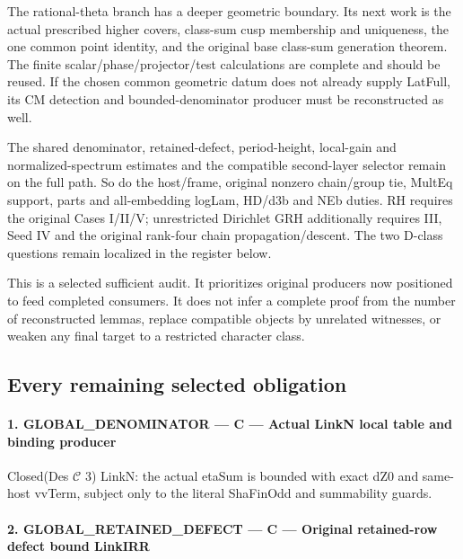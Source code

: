 The rational-theta branch has a deeper geometric boundary. Its next work is the actual prescribed higher covers, class-sum cusp membership and uniqueness, the one common point identity, and the original base class-sum generation theorem. The finite scalar/\allowbreak{}phase/\allowbreak{}projector/\allowbreak{}test calculations are complete and should be reused. If the chosen common geometric datum does not already supply LatFull, its CM detection and bounded-denominator producer must be reconstructed as well.

The shared denominator, retained-defect, period-height, local-gain and normalized-spectrum estimates and the compatible second-layer selector remain on the full path. So do the host/\allowbreak{}frame, original nonzero chain/\allowbreak{}group tie, MultEq support, parts and all-embedding logLam, HD/\allowbreak{}d3b and NEb duties. RH requires the original Cases I/\allowbreak{}II/\allowbreak{}V; unrestricted Dirichlet GRH additionally requires III, Seed IV and the original rank-four chain propagation/\allowbreak{}descent. The two D-class questions remain localized in the register below.

This is a selected sufficient audit. It prioritizes original producers now positioned to feed completed consumers. It does not infer a complete proof from the number of reconstructed lemmas, replace compatible objects by unrelated witnesses, or weaken any final target to a restricted character class.

\subsection{Every remaining selected obligation}

\paragraph{1. GLOBAL\_\allowbreak{}DENOMINATOR — C — Actual LinkN local table and binding producer}

Closed(Des $\mathcal C$ 3) LinkN: the actual etaSum is bounded with exact dZ0 and same-host vvTerm, subject only to the literal ShaFinOdd and summability guards.

\paragraph{2. GLOBAL\_\allowbreak{}RETAINED\_\allowbreak{}DEFECT — C — Original retained-row defect bound LinkIRR}

